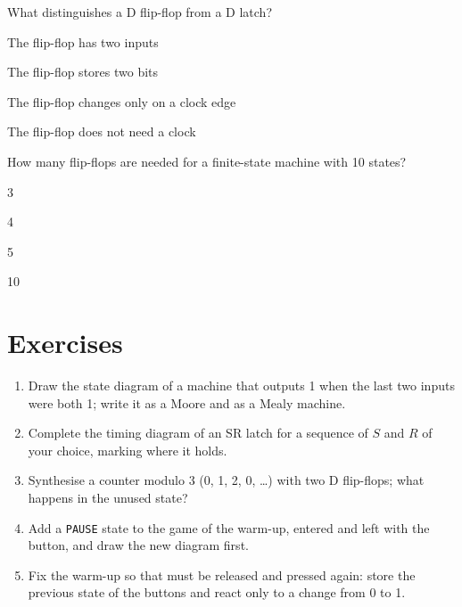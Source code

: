 \begin{quiz}{What distinguishes a D flip-flop from a D latch?}
\item The flip-flop has two inputs
\item The flip-flop stores two bits
\item The flip-flop changes only on a clock edge
\item The flip-flop does not need a clock
\end{quiz}

\begin{quiz}{How many flip-flops are needed for a finite-state machine with 10 states?}
\item 3
\item 4
\item 5
\item 10
\end{quiz}

\section{Exercises}

\begin{exercise}
\begin{enumerate}[nosep]
\item Draw the state diagram of a machine that outputs 1 when the last two
  inputs were both 1; write it as a Moore and as a Mealy machine.
\item Complete the timing diagram of an SR latch for a sequence of $S$ and $R$
  of your choice, marking where it holds.
\item Synthesise a counter modulo 3 (0, 1, 2, 0, \ldots) with two D
  flip-flops; what happens in the unused state?
\item Add a \texttt{PAUSE} state to the game of the warm-up, entered and left
  with the  button, and draw the new diagram first.
\item Fix the warm-up so that  must be released and pressed again:
  store the previous state of the buttons and react only to a change from 0
  to 1.
\end{enumerate}
\end{exercise}

